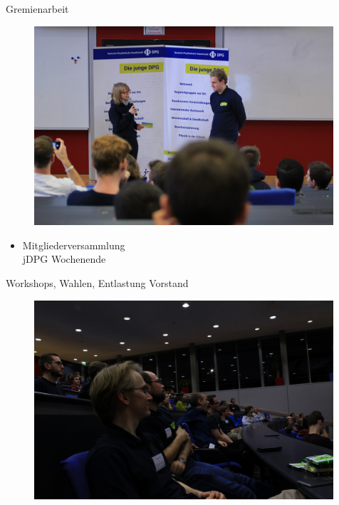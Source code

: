 \documentclass[
]{beamer}
\begin{document}
\begin{frame}{Gremienarbeit}
  \begin{minipage}{0.28\textwidth}
    \begin{figure}
      \centering
      \includegraphics[width=0.99\textwidth]{figure/MV_2018_badHonnef_christina_mathias}
     \end{figure}
  \end{minipage}%
  \hfill
  \begin{minipage}{0.38\textwidth}
    \begin{itemize}
      \item Mitgliederversammlung\\
      jDPG Wochenende
    \end{itemize}
    \begin{center}
      Workshops, Wahlen, Entlastung Vorstand
    \end{center}
  \end{minipage}
  \hfill
  \begin{minipage}{0.28\textwidth}
    \begin{figure}
      \centering
      \includegraphics[width=0.99\textwidth]{figure/MV_2018_badHonnef_publikum}
     \end{figure}
  \end{minipage}


\end{frame}
\end{document}
